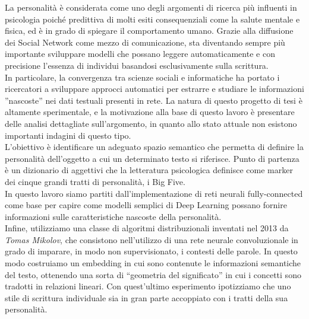 \documentclass[11pt]{toptesi}
\makeatletter
\newcommand\listofcodes{%
 \iffrontmatter\else\frontmattertrue\fi
 \if@openright\cleardoublepage\else\clearpage\fi
 \begingroup\def\chapter##1{\@schapter}
 \phantomsection %
 \lstlistoflistings 
 \endgroup
}
\makeatother
\begin{document}
La personalità è considerata come uno degli argomenti di ricerca più influenti in psicologia poiché predittiva di molti esiti consequenziali come la salute mentale e fisica, ed è in grado di spiegare il comportamento umano.
Grazie alla diffusione dei Social Network come mezzo di comunicazione, sta diventando sempre più importante sviluppare modelli che possano leggere automaticamente e con precisione l'essenza di individui basandosi esclusivamente sulla scrittura. 
\\
In particolare, la convergenza tra scienze sociali e informatiche ha portato i ricercatori a sviluppare approcci automatici per estrarre e studiare le informazioni ''nascoste'' nei dati testuali presenti in rete.
La natura di questo progetto di tesi è altamente sperimentale, e la motivazione alla base di questo lavoro è presentare delle analisi dettagliate sull'argomento, in quanto allo stato attuale non esistono importanti indagini di questo tipo.
\\
L'obiettivo è identificare un adeguato spazio semantico che permetta di definire la personalità dell'oggetto a cui un determinato testo si riferisce. Punto di partenza è un dizionario di aggettivi che la letteratura psicologica definisce come marker dei cinque grandi tratti di personalità, i Big Five.
\\
In questo lavoro siamo partiti dall'implementazione di reti neurali  fully-connected come base per capire come modelli semplici di Deep Learning possano fornire informazioni sulle caratteristiche nascoste della personalità. 
\\
Infine, utilizziamo una classe di algoritmi distribuzionali inventati nel 2013 da \emph{Tomas Mikolov}, che consistono nell'utilizzo di una rete neurale convoluzionale in grado di imparare, in modo non supervisionato, i contesti delle parole.
In questo modo costruiamo un embedding in cui sono contenute le informazioni semantiche del testo, ottenendo una sorta di “geometria del significato” in cui i concetti sono tradotti in relazioni lineari.
Con quest'ultimo esperimento ipotizziamo che uno stile di scrittura individuale sia in gran parte accoppiato con i tratti della sua personalità.


\tableofcontents

\listoffigures

\listoftables


\introduzione



\mainmatter
%






\appendix



\printbibliography
{}
\end{document}
